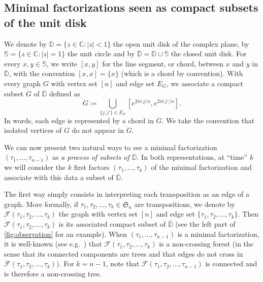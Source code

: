 \documentclass[10pt]{amsart}
\theoremstyle{definition}\newtheorem{defi}[theo]{Definition}\newtheorem{rema}[theo]{Remark}\newtheorem{exam}[theo]{Example}\newtheorem{exem}[theo]{Example}\newtheorem{nota}[theo]{Notation}
\newcommand{\D}{\mathbb{D}}
\newcommand{\CC}{\mathbb{C}}
\def\S{\mathbb{S}}
\def\FFF{\mathcal F}
\begin{document}
\subsection{Minimal factorizations seen as compact subsets of the unit disk}
\label{sec:introcompacts}

We denote by $\D = \{z \in \CC : |z| < 1\}$ the open unit disk of the complex plane, by $\S = \{z \in \CC : |z| = 1\}$ the unit circle and by $\overline{\D} = \D \cup \S$ the closed unit disk. For every $x, y \in \S$, we write $[x,y]$ for the line segment, or chord, between $x$ and $y$ in $\overline{\D}$, with the convention $[x,x] = \{x\}$ (which is a chord by convention).
With every graph $G$ with vertex set $[n]$ and edge set $E_G$, we associate a compact subset $\dot{G}$ of  $\overline{\D}$
defined as
\[\dot{G} \coloneqq \bigcup_{ \{j,j'\} \in E_G}[e^{2 \pi i\, j/n}, e^{2 \pi i\, j'/n} ].\]
In words, each edge is represented by a chord in $\dot{G}$.
We take the convention that isolated vertices of $G$ do not appear in $\dot{G}$.

We can now present two natural ways to see a minimal factorization $(\tau_1,\dots,\tau_{n-1})$ as
{\em a process of subsets of $\overline{\D}$}.
In both representations, at ``time'' $k$ we will consider the $k$ first factors
$(\tau_1,\dots,\tau_k)$ of the minimal factorization
and associate with this data a subset of $\overline{\D}$.

The first way simply consists  in interpreting each transposition as an edge of a graph.
More formally,
if $\tau_{1}, \tau_{2}, \ldots, \tau_{k} \in \mathfrak{S}_{n}$ are transpositions, we denote by $\FFF(\tau_{1} ,\tau_{2} ,\ldots ,\tau_{k})$ the graph with vertex set $[n]$ and edge set $\{\tau_{1}, \tau_{2}, \ldots, \tau_{k}\}$.
Then $\dot{\FFF}(\tau_{1} ,\tau_{2} ,\ldots ,\tau_{k})$ is its associated compact subset of $\overline{\D}$
(see the left part of \cref{fig:observation} for an example).
When $(\tau_{1}, \ldots, \tau_{n-1})$ is a minimal factorization,
it is well-known (see e.g.\ \cite[Theorem 2.2]{GY02}) that $\FFF(\tau_{1} ,\tau_{2} ,\ldots ,\tau_{k})$ is a non-crossing forest
(in the sense that its connected components are trees and that edges do not cross in  $\dot{\FFF}(\tau_{1} ,\tau_{2} ,\ldots ,\tau_{k})$).
For $k=n-1$, note that $\FFF(\tau_{1}, \tau_{2}, \ldots, \tau_{n-1})$ is connected and is therefore a non-crossing tree.
\end{document}
